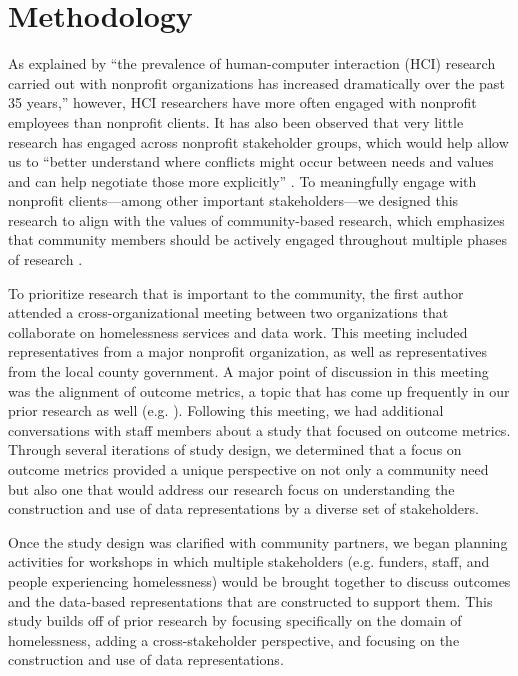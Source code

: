 \section{Methodology}
As explained by \citet{Bopp2019Voices} ``the prevalence of human-computer interaction (HCI) research carried out with nonprofit organizations has increased dramatically over the past 35 years,'' however, HCI researchers have more often engaged with nonprofit employees than nonprofit clients. It has also been observed that very little research has engaged across nonprofit stakeholder groups, which would help allow us to ``better understand where conflicts might occur between needs and values and can help negotiate those more explicitly'' \citep{Bopp2019Voices}. To meaningfully engage with nonprofit clients---among other important stakeholders---we designed this research to align with the values of community-based research, which emphasizes that community members should be actively engaged throughout multiple phases of research \citep{Israel1998CBR}.

To prioritize research that is important to the community, the first author attended a cross-organizational meeting between two organizations that collaborate on homelessness services and data work. This meeting included representatives from a major nonprofit organization, as well as representatives from the local county government. A major point of discussion in this meeting was the alignment of outcome metrics, a topic that has come up frequently in our prior research as well (e.g. \citet{Bopp2017DbD}). Following this meeting, we had additional conversations with staff members about a study that focused on outcome metrics. Through several iterations of study design, we determined that a focus on outcome metrics provided a unique perspective on not only a community need but also one that would address our research focus on understanding the construction and use of data representations by a diverse set of stakeholders.

Once the study design was clarified with community partners, we began planning activities for workshops in which multiple stakeholders (e.g. funders, staff, and people experiencing homelessness) would be brought together to discuss outcomes and the data-based representations that are constructed to support them. This study builds off of prior research \citep{Bopp2019Primary,Benjamin2018Policy} by focusing specifically on the domain of homelessness, adding a cross-stakeholder perspective, and focusing on the construction and use of data representations.

